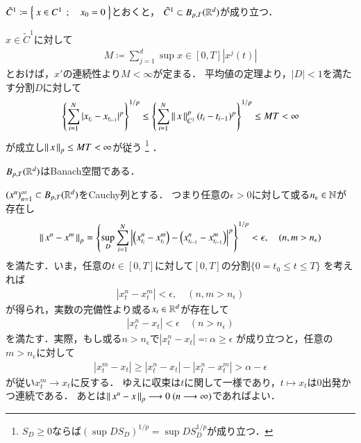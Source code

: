 \begin{screen}
	\begin{thm}
		$\tilde{C}^1 \coloneqq \left\{\ x \in C^1\ \, ; \quad x_0 = 0\ \right\}$とおくと，
		$\tilde{C}^1 \subset B_{p,T}(\mathbb{R}^d)$が成り立つ．
	\end{thm}
\end{screen}

\begin{prf}
	$x \in \tilde{C}^1$に対して
	\begin{align}
		M \coloneqq \sum_{j=1}^{d} \sup{x \in [0,T]}{|x^j(t)|}
	\end{align}
	とおけば，$x'$の連続性より$M < \infty$が定まる．
	平均値の定理より，$|D| < 1$を満たす分割$D$に対して
	\begin{align}
		\left\{ \sum_{i=1}^{N} |x_{t_i} - x_{t_{i-1}}|^p \right\}^{1/p}
		\leq \left\{ \sum_{i=1}^{N} \left\|\, x\, \right\|_{C^1}^p (t_i - t_{i-1})^p \right\}^{1/p}
		\leq M T < \infty
	\end{align}
	が成立し$\left\|\, x\, \right\|_{p} \leq MT < \infty$が従う
	\footnote{
		$S_D \geq 0$ならば$(\sup{D}S_D)^{1/p} = \sup{D}S_D^{1/p}$が成り立つ．
	}
	．
\end{prf}

\begin{screen}
	\begin{thm}
		$B_{p,T}(\mathbb{R}^d)$はBanach空間である．
	\end{thm}
\end{screen}

\begin{prf}
	$(x^n)_{n=1}^{\infty} \subset B_{p,T}(\mathbb{R}^d)$をCauchy列とする．
	つまり任意の$\epsilon > 0$に対して或る$n_\epsilon \in \mathbb{N}$が存在し
	\begin{align}
		\left\|\, x^n - x^m\, \right\|_{p}
		= \left\{ \operatorname*{sup}_{D} \sum_{i=1}^{N} 
		\left| \left( x^n_{t_i} - x^m_{t_i} \right) 
		- \left(x^n_{t_{i-1}} - x^m_{t_{i-1}} \right) \right|^p \right\}^{1/p} < \epsilon,
		\quad (n,m > n_\epsilon)
	\end{align}
	を満たす．いま，任意の$t \in [0,T]$に対して$[0,T]$の分割$\{0=t_0 \leq t \leq T\}$
	を考えれば
	\begin{align}
		|x^n_t - x^m_t| < \epsilon,
		\quad (n,m > n_\epsilon)
	\end{align}
	が得られ，実数の完備性より或る$x_t \in \mathbb{R}^d$が存在して
	\begin{align}
		|x^n_t - x_t| < \epsilon
		\quad (n > n_\epsilon)
	\end{align}
	を満たす．実際，もし或る$n > n_\epsilon$で$|x^n_t - x_t| \eqqcolon \alpha \geq \epsilon$
	が成り立つと，任意の$m > n_\epsilon$に対して
	\begin{align}
		|x^m_t - x_t| \geq |x^n_t - x_t| - |x^n_t - x^m_t| > \alpha - \epsilon
	\end{align}
	が従い$x^m_t \longrightarrow x_t$に反する．
	ゆえに収束は$t$に関して一様であり，$t \longmapsto x_t$は0出発かつ連続である．
	あとは$\left\|\, x^n - x\, \right\|_{p} \longrightarrow 0\ (n \longrightarrow \infty)$であればよい．
\end{prf}

